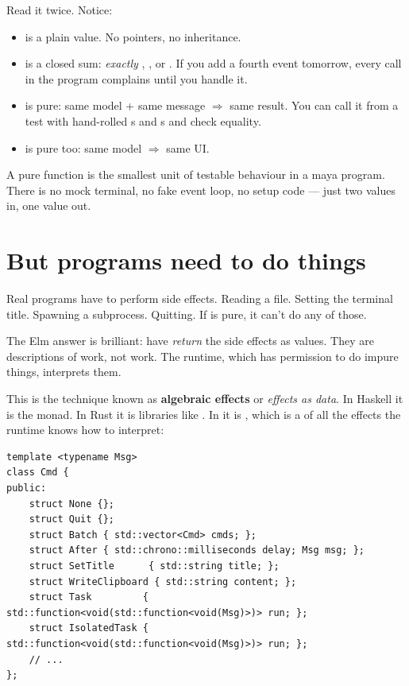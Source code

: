 Read it twice. Notice:

\begin{itemize}[leftmargin=*]
  \item {} is a plain value. No pointers, no inheritance.
  \item {} is a closed sum: \emph{exactly} ,
    , or . If you add a fourth event tomorrow,
    every  call in the program complains until you
    handle it.
  \item {} is pure: same model + same message $\Rightarrow$
    same result. You can call it from a test with hand-rolled
    s and s and check equality.
  \item {} is pure too: same model $\Rightarrow$ same UI.
\end{itemize}

\begin{idea}
A pure  function is the smallest unit of testable
behaviour in a maya program. There is no mock terminal, no fake
event loop, no setup code --- just two values in, one value out.
\end{idea}

\section{But programs need to do things}

Real programs have to perform side effects. Reading a file. Setting
the terminal title. Spawning a subprocess. Quitting. If 
is pure, it can't do any of those.

The Elm answer is brilliant: have  \emph{return} the side
effects as values. They are descriptions of work, not work. The
runtime, which has permission to do impure things, interprets them.

This is the technique known as \textbf{algebraic effects} or
\emph{effects as data}. In Haskell it is the  monad. In Rust
it is libraries like . In \maya{} it is
, which is a  of all the effects the
runtime knows how to interpret:

\begin{lstlisting}
template <typename Msg>
class Cmd {
public:
    struct None {};
    struct Quit {};
    struct Batch { std::vector<Cmd> cmds; };
    struct After { std::chrono::milliseconds delay; Msg msg; };
    struct SetTitle      { std::string title; };
    struct WriteClipboard { std::string content; };
    struct Task         { std::function<void(std::function<void(Msg)>)> run; };
    struct IsolatedTask { std::function<void(std::function<void(Msg)>)> run; };
    // ...
};
\end{lstlisting}

